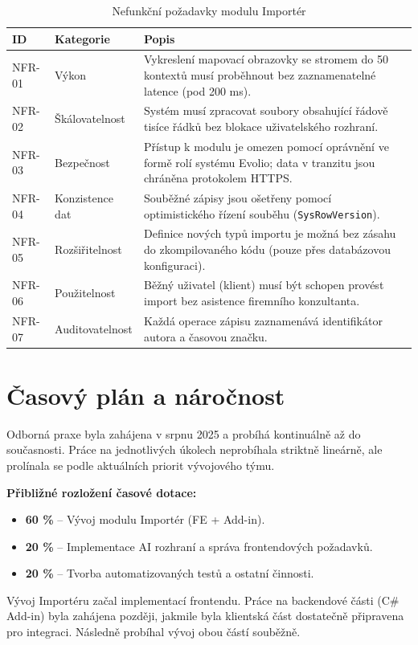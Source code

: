 \begin{table}[!htbp]
\centering
\caption{Nefunkční požadavky modulu Importér}
\label{tab:nonfunctional_requirements}
\begin{tabular}{|l|p{3.3cm}|p{7.2cm}|}
\hline
\textbf{ID} & \textbf{Kategorie} & \textbf{Popis} \\ \hline
NFR-01 & Výkon & Vykreslení mapovací obrazovky se stromem do 50 kontextů musí proběhnout bez zaznamenatelné latence (pod 200 ms). \\ \hline
NFR-02 & Škálovatelnost & Systém musí zpracovat soubory obsahující řádově tisíce řádků bez blokace uživatelského rozhraní. \\ \hline
NFR-03 & Bezpečnost & Přístup k modulu je omezen pomocí oprávnění ve formě rolí systému Evolio; data v tranzitu jsou chráněna protokolem HTTPS. \\ \hline
NFR-04 & Konzistence dat & Souběžné zápisy jsou ošetřeny pomocí optimistického řízení souběhu (\texttt{SysRowVersion}). \\ \hline
NFR-05 & Rozšiřitelnost & Definice nových typů importu je možná bez zásahu do zkompilovaného kódu (pouze přes databázovou konfiguraci). \\ \hline
NFR-06 & Použitelnost & Běžný uživatel (klient) musí být schopen provést import bez asistence firemního konzultanta. \\ \hline
NFR-07 & Auditovatelnost & Každá operace zápisu zaznamenává identifikátor autora a časovou značku. \\ \hline
\end{tabular}
\end{table}
\section{Časový plán a náročnost}

Odborná praxe byla zahájena v srpnu 2025 a probíhá kontinuálně až do současnosti. Práce na jednotlivých úkolech neprobíhala striktně lineárně, ale prolínala se podle aktuálních priorit vývojového týmu.

\textbf{Přibližné rozložení časové dotace:}
\begin{itemize}
    \item \textbf{60 \%} – Vývoj modulu Importér (FE + Add-in).
    \item \textbf{20 \%} – Implementace AI rozhraní a správa frontendových požadavků.
    \item \textbf{20 \%} – Tvorba automatizovaných testů a ostatní činnosti.
\end{itemize}

Vývoj Importéru začal implementací frontendu. Práce na backendové části (C\# Add-in) byla zahájena později, jakmile byla klientská část dostatečně připravena pro integraci. Následně probíhal vývoj obou částí souběžně.